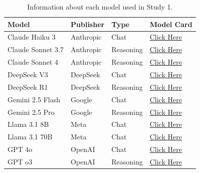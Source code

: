 \documentclass{article}
\begin{document}
\begin{appendices}
\begin{table}[ht]
    \centering
    \small
    \begin{tabular}{l|lll}
        \toprule
        \textbf{Model}      & \textbf{Publisher}    & \textbf{Type}     & \textbf{Model Card} \\
        \midrule
        Claude Haiku 3      & Anthropic             & Chat              & \href{https://assets.anthropic.com/m/61e7d27f8c8f5919/original/Claude-3-Model-Card.pdf}{Click Here} \\
        Claude Sonnet 3.7   & Anthropic             & Reasoning         & \href{https://assets.anthropic.com/m/785e231869ea8b3b/original/claude-3-7-sonnet-system-card.pdf}{Click Here} \\
        Claude Sonnet 4     & Anthropic             & Reasoning         & \href{https://www-cdn.anthropic.com/6d8a8055020700718b0c49369f60816ba2a7c285.pdf}{Click Here} \\ 
        DeepSeek V3         & DeepSeek              & Chat              & \href{https://huggingface.co/deepseek-ai/DeepSeek-V3}{Click Here} \\
        DeepSeek R1         & DeepSeek              & Reasoning         & \href{https://huggingface.co/deepseek-ai/DeepSeek-R1}{Click Here} \\ 
        Gemini 2.5 Flash    & Google                & Chat              & \href{https://modelcards.withgoogle.com/assets/documents/gemini-2.5-flash.pdf}{Click Here} \\
        Gemini 2.5 Pro      & Google                & Reasoning         & \href{https://modelcards.withgoogle.com/assets/documents/gemini-2.5-pro.pdf}{Click Here} \\ 
        Llama 3.1 8B        & Meta                  & Chat              & \href{https://huggingface.co/meta-llama/Llama-3.1-8B-Instruct}{Click Here} \\
        Llama 3.1 70B       & Meta                  & Chat         & \href{https://huggingface.co/meta-llama/Llama-3.1-70B-Instruct}{Click Here} \\ 
        GPT 4o              & OpenAI                & Chat              & \href{https://openai.com/index/gpt-4o-system-card/}{Click Here} \\
        GPT o3              & OpenAI                & Reasoning         & \href{https://openai.com/index/o3-o4-mini-system-card/}{Click Here} \\
        \bottomrule
    \end{tabular}
    \caption{Information about each model used in Study 1.}

\end{table}



\clearpage
\end{appendices}
\end{document}
